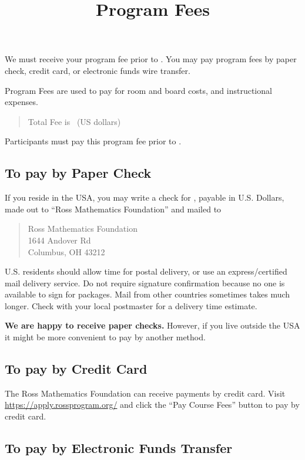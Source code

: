 \documentclass[11pt]{ross}
\title{Program Fees}
\begin{document}
\maketitle

We must receive your program fee prior to \feeduedate.  You may pay
program fees by paper check, credit card, or electronic funds wire
transfer.

Program Fees are used to pay for room and board costs, and instructional expenses.
\begin{quote}
Total Fee is \totalfee \ (US dollars)
\end{quote}  

Participants must pay this program fee prior to \feeduedate.

\subsection*{To pay by Paper Check}

If you reside in the USA, you may write a check for \totalfee, payable
in U.S. Dollars, made out to ``Ross Mathematics Foundation'' and
mailed to
\begin{quote}
Ross Mathematics Foundation  \\
1644 Andover Rd \\
Columbus, OH 43212
\end{quote} U.S. residents should allow time for postal delivery, or
use an express/certified mail delivery service. Do not require
signature confirmation because no one is available to sign for
packages.  Mail from other countries sometimes takes much longer.
Check with your local postmaster for a delivery time estimate.

\textbf{We are happy to receive paper checks.}  However, if you live
outside the USA it might be more convenient to pay by another method.

\subsection*{To pay by Credit Card}

The Ross Mathematics Foundation can receive payments by credit card.
Visit \url{https://apply.rossprogram.org/} and click the ``Pay Course
Fees'' button to pay by credit card.

\subsection*{To pay by Electronic Funds Transfer}
\end{document}
